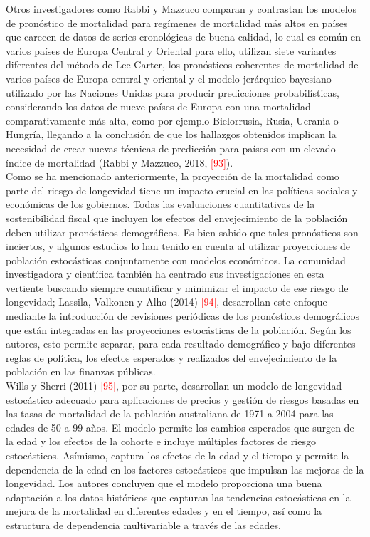 Otros investigadores como Rabbi y Mazzuco comparan y contrastan los modelos de pronóstico de mortalidad para regímenes de mortalidad más altos en países que carecen de datos de series cronológicas de buena calidad, lo cual es común en varios países de Europa Central y Oriental para ello, utilizan siete variantes diferentes del método de Lee-Carter, los pronósticos coherentes de mortalidad de varios países de Europa central y oriental y el modelo jerárquico bayesiano utilizado por las Naciones Unidas para producir predicciones probabilísticas, considerando los datos de nueve países de Europa con una mortalidad comparativamente más alta, como por ejemplo Bielorrusia, Rusia, Ucrania o Hungría, llegando a la conclusión de que los hallazgos obtenidos implican la necesidad de crear nuevas técnicas de predicción para países con un elevado índice de mortalidad (Rabbi y Mazzuco, 2018, \textcolor{red}{[93]}).\\

Como se ha mencionado anteriormente, la proyección de la mortalidad como parte del riesgo de longevidad tiene un impacto crucial en las políticas sociales y económicas de los gobiernos. Todas las evaluaciones cuantitativas de la sostenibilidad fiscal que incluyen los efectos del envejecimiento de la población deben utilizar pronósticos demográficos. Es bien sabido que tales pronósticos son inciertos, y algunos estudios lo han tenido en cuenta al utilizar proyecciones de población estocásticas conjuntamente con modelos económicos. La comunidad investigadora y científica también ha centrado sus investigaciones en esta vertiente buscando siempre cuantificar y minimizar el impacto de ese riesgo de longevidad; Lassila, Valkonen y Alho (2014) \textcolor{red}{[94]}, desarrollan este enfoque mediante la introducción de revisiones periódicas de los pronósticos demográficos que están integradas en las proyecciones estocásticas de la población. Según los autores, esto permite separar, para cada resultado demográfico y bajo diferentes reglas de política, los efectos esperados y realizados del envejecimiento de la población en las finanzas públicas.\\

Wills y Sherri (2011)  \textcolor{red}{[95]}, por su parte, desarrollan un modelo de longevidad estocástico adecuado para aplicaciones de precios y gestión de riesgos basadas en las tasas de mortalidad de la población australiana de 1971 a 2004 para las edades de 50 a 99 años. El modelo permite los cambios esperados que surgen de la edad y los efectos de la cohorte e incluye múltiples factores de riesgo estocásticos. Asímismo, captura los efectos de la edad y el tiempo y permite la dependencia de la edad en los factores estocásticos que impulsan las mejoras de la longevidad. Los autores concluyen que el modelo proporciona una buena adaptación a los datos históricos que capturan las tendencias estocásticas en la mejora de la mortalidad en diferentes edades y en el tiempo, así como la estructura de dependencia multivariable a través de las edades.\\

